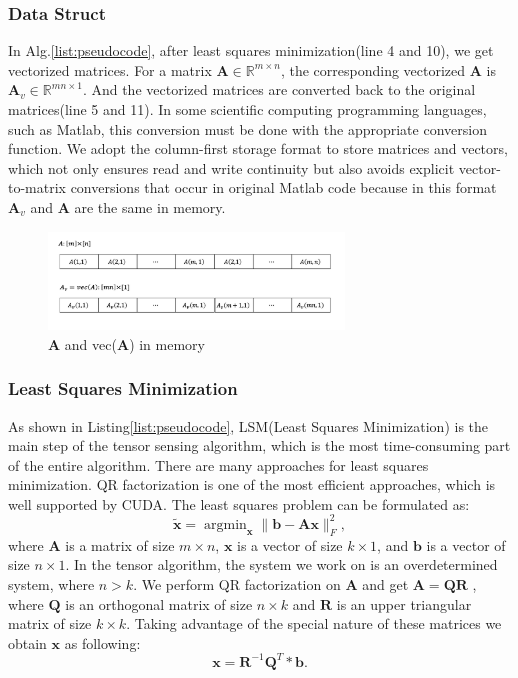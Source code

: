 \documentclass[journal,article,submit,moreauthors,pdftex,10pt,a4paper]{Definitions/mdpi}
\theoremstyle{plain}
\theoremstyle{definition}
\theoremstyle{remark}
\begin{document}
\subsubsection{Data Struct}
In Alg.\ref{list:pseudocode}, after least squares minimization(line 4 and 10), we get vectorized matrices. For a matrix $\mathbf{A} \in \mathbb{R}^{m \times n}$, the corresponding vectorized $\mathbf{A}$ is $\mathbf{A}_v \in \mathbb{R}^{mn \times 1}$. And the vectorized matrices are converted back to the original matrices(line 5 and 11). In some scientific computing programming languages, such as Matlab, this conversion must be done with the appropriate conversion function.
We adopt the column-first storage format to store matrices and vectors, which not only ensures read and write continuity but also avoids explicit vector-to-matrix conversions that occur in original Matlab code because in this format $\mathbf{A}_v$ and $\mathbf{A}$ are the same in memory.
\begin{figure}[H]
\centering
\includegraphics[width=0.7\textwidth]{vec2mat.png}
\caption{$\mathbf{A}$ and vec($\mathbf{A}$) in memory}
\label{Fig:vec2mat}
\end{figure}
\subsubsection{Least Squares Minimization}
As shown in Listing\ref{list:pseudocode}, LSM(Least Squares Minimization) is the main step of the tensor sensing algorithm, which is the most time-consuming part of the entire algorithm. There are many approaches for least squares minimization. QR factorization is one of the most efficient approaches, which is well supported by CUDA.
The least squares problem can be formulated as:
\begin{equation}
\widetilde{\mathbf{x}} = \mathop{\arg \min}_{\mathbf{x}} \| \mathbf{b} - \mathbf{A} \mathbf{x} \|^2_F,
\end{equation}
where $\mathbf{A}$ is a matrix of size $m \times n$, $\mathbf{x}$ is a vector
of size $k \times 1$, and $\mathbf{b}$ is a vector of size $n \times 1$. In the tensor
algorithm, the system we work on is an overdetermined system, where $n >
 k$.
 We perform QR factorization on $\mathbf{A}$ and get $\mathbf{A} = \mathbf{Q}\mathbf{R}$ , where $\mathbf{Q}$ is an
 orthogonal matrix of size $n \times k $ and $\mathbf{R}$ is an upper triangular matrix of size $k \times k$. Taking advantage of the special nature of these matrices we obtain $\mathbf{x}$
as following:
\begin{equation}
\mathbf{x} = \mathbf{R}^{-1}\mathbf{Q}^{T} \ast \mathbf{b}.
\end{equation}
\end{document}
